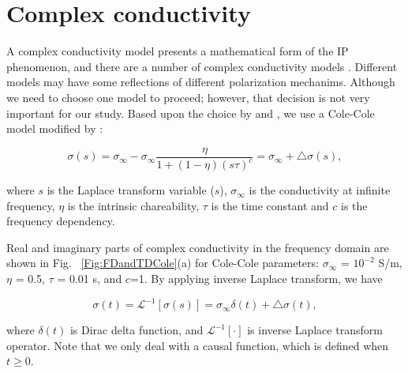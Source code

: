 \documentclass[extra,mreferee]{gji}
\newcommand{\siginf}{\sigma_\infty}
\begin{document}
\section{Complex conductivity}
A complex conductivity model presents a mathematical form of the IP phenomenon, and there are a number of complex conductivity models \cite[]{Pelton1978,Dias2000,Tarasov2013}. Different models may have some reflections of different polarization mechanims. Although we need to choose one model to proceed; however, that decision is not very important for our study. Based upon the choice by \cite{Marchant2014} and \cite{Smith1988a}, we use a Cole-Cole model \cite[]{COLE} modified by \cite{Pelton1978}: 
\begin{linenomath*}
\begin{equation}
  \sigma(s) = \sigma_{\infty} - \sigma_{\infty}\frac{\eta}{1+(1-\eta)(s \tau)^c} = \sigma_{\infty} + \triangle\sigma(s),
  \label{eq: sigma_freq}
\end{equation}
\end{linenomath*}
where $s$ is the Laplace transform variable ($s$), $\sigma_{\infty}$ is the conductivity at infinite frequency, $\eta$ is the intrinsic chareability, $\tau$ is the time constant and $c$ is the frequency dependency. 


Real and imaginary parts of complex conductivity in the frequency domain are shown in Fig. ~\ref{Fig:FDandTDCole}(a) for Cole-Cole parameters: $\siginf$ = $10^{-2}$ S/m, $\eta $ = 0.5, $\tau$ = 0.01 s, and $c$=1. 
By applying inverse Laplace transform, we have
\begin{linenomath*}
\begin{equation}
  \sigma(t) = \mathscr{L}^{-1}[\sigma(s)] = \sigma_{\infty}\delta(t) + \triangle\sigma(t),
  \label{eq: sigma_time}
\end{equation}
\end{linenomath*}
where $\delta(t)$ is Dirac delta function, and $\mathscr{L}^{-1}[\cdot]$ is inverse Laplace transform operator. Note that we only deal with a causal function, which is defined when $t\ge 0$. 
\end{document}
